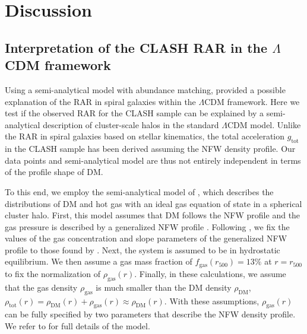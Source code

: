 \documentclass[a4paper,iop,twocolumn,twocolappendix,numberedappendix,appendixfloats]{emulateapj}
\newcommand{\percent}{\ensuremath{\%}}
\newcommand{\gtot}{g_\mathrm{tot}}
\newcommand{\fgas}{f_\mathrm{gas}}
\begin{document}
\section{Discussion}
\label{sec:discussion}

\subsection{Interpretation of the CLASH RAR in the $\Lambda$CDM framework}
\label{sec:SAM}

Using a semi-analytical model with abundance matching, \citet{Navarro17}
provided a possible explanation of the RAR in spiral galaxies within the
$\Lambda$CDM framework.
Here we test if the observed RAR for the CLASH sample can be explained
by a semi-analytical description of cluster-scale halos in the standard
$\Lambda$CDM model.
Unlike the RAR in spiral galaxies based on stellar kinematics,
 the total acceleration $\gtot$ in the CLASH sample has been derived
 assuming the NFW density profile.
 Our data points and semi-analytical model are thus not entirely
 independent in terms of the profile shape of DM.

To this end, we employ the semi-analytical model of \citet{Olamaie12},
which describes the distributions of DM and hot gas
with an ideal gas equation of state
in a spherical cluster halo.
First, this model assumes that DM follows the NFW profile
\citep{Umetsu11b,Umetsu16,Niikura15,Okabe16} and
the gas pressure is described by a generalized NFW profile \citep{Nagai07}.
Following \citet{Olamaie12}, we fix the values of the gas concentration
and slope parameters of the generalized NFW profile to those found by
\citet{Arnaud10}.
Next, the system is assumed to be in hydrostatic equilibrium.
We then assume a gas mass fraction of $\fgas(r_{500})=13\percent$
\citep[e.g.,][]{planck2013fgas,Donahue14} at $r=r_{500}$ to fix the
normalization of $\rho_\mathrm{gas}(r)$.
Finally, in these calculations, we assume that
the gas density $\rho_\mathrm{gas}$ is much smaller than the DM density
$\rho_\mathrm{DM}$,
$\rho_\mathrm{tot}(r)=\rho_\mathrm{DM}(r)+\rho_\mathrm{gas}(r)\approx\rho_\mathrm{DM}(r)$.
With these assumptions, $\rho_\mathrm{gas}(r)$ can be fully specified
by two parameters that describe the NFW density profile.
We refer to \citet{Olamaie12} for full details of the model.
\end{document}
